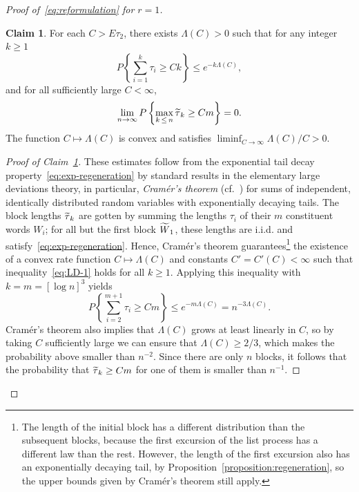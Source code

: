 \documentclass[10pt]{amsart}
\theoremstyle{definition}\newtheorem{defi}[theo]{Definition}\newtheorem{rema}[theo]{Remark}\newtheorem{exam}[theo]{Example}\newtheorem{exem}[theo]{Example}\newtheorem{nota}[theo]{Notation}
\newtheorem{claim}{Claim}}
\let\oldtilde\tilde
\renewcommand*{\tilde}[1]{\mathchoice{\widetilde{#1}}{\widetilde{#1}}{\oldtilde{#1}}{\oldtilde{#1}}}\let\oldforall\forall
\renewcommand*{\forall}{\mathrel{\oldforall}}
\begin{document}
\begin{proof}[Proof of~\eqref{eq:reformulation} for $r= 1$]
\begin{claim}\label{claim:no-long-blocks}
For each $C>E\tau_{2}$, there exists $\Lambda (C)>0$ such that for any integer $k\geq 1$
\begin{equation}\label{eq:LD-1}
P\left\{ \sum_{i=1}^{k} \tau_{i} \geq Ck\right\}\leq e^{-k\Lambda (C)},
\end{equation}
and for all sufficiently large $C<\infty$,
\begin{equation}\label{eq:LD-2}
\lim_{n \rightarrow \infty}P\left\{\max_{k\,\leq\,n} \tilde{\tau}_{k}\geq Cm\right\}=0.
\end{equation}
The function $C\mapsto \Lambda (C)$ is convex and satisfies $\liminf_{C \rightarrow \infty}\Lambda (C)/C>0$.
\end{claim}

\begin{proof}[Proof of Claim~\ref{claim:no-long-blocks}]
These estimates follow from the exponential tail decay property~\eqref{eq:exp-regeneration} by standard results in the elementary large deviations theory, in particular, \emph{Cramér's theorem} (cf.~\cite[Section~2.2]{dembo-zeitouni}) for sums of independent, identically distributed random variables with exponentially decaying tails. The block lengths $\tilde{\tau}_{k}$ are gotten by summing the lengths $\tau_{i}$ of their $m$ constituent words $W_{i}$; for all but the first block $\tilde{W}_{1}$, these lengths are i.i.d. and satisfy~\eqref{eq:exp-regeneration}. Hence, Cramér's theorem guarantees\footnote{The length of the initial block has a different distribution than the subsequent blocks, because the first excursion of the list process has a different law than the rest. However, the length of the first excursion also has an exponentially decaying tail, by Proposition~\ref{proposition:regeneration}, so the upper bounds given by Cramér's theorem still apply.} the existence of a convex rate function $C\mapsto \Lambda (C)$ and constants $C'=C' (C) <\infty$ such that inequality~\eqref{eq:LD-1} holds for all $k\geq 1$. Applying this inequality with $k=m=[\log n]^{3}$ yields
\[
P\left\{\sum_{i=2}^{m+1} \tau_{i}\geq Cm\right\}\leq e^{-m \Lambda (C)}=n^{-3\Lambda (C)}.
\]
Cramér's theorem also implies that $\Lambda (C)$ grows at least linearly in $C$, so by taking $C$ sufficiently large we can ensure that $\Lambda (C)\geq 2/3$, which makes the probability above smaller than $n^{-2}$. Since there are only $n$ blocks, it follows that the probability that $\tilde{\tau}_{k}\geq Cm$ for one of them is smaller than $n^{-1}$.
\end{proof}


\end{proof}
\end{document}
